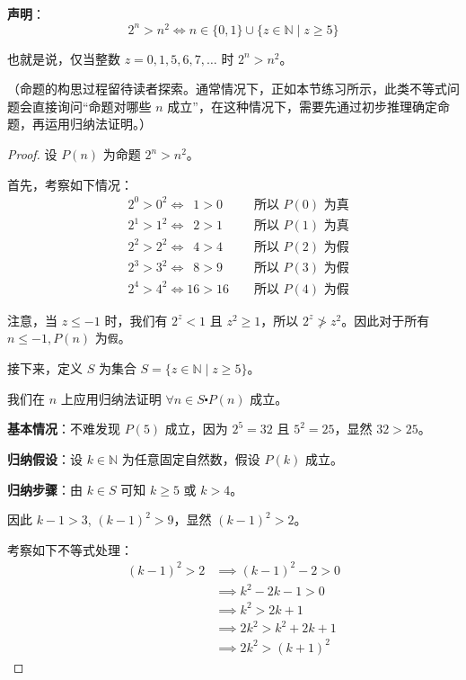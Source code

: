 \begin{example}[比较 $2^n$ 与 $n^2$ 的大小]

    \textbf{声明}：
    \[2^n > n^2 \iff n \in \{0,1\} \cup \{z \in \mathbb{N} \mid z \ge 5\}\]

    也就是说，仅当整数 $z=0,1,5,6,7,\dots$ 时 $2^n > n^2$。

    （命题的构思过程留待读者探索。通常情况下，正如本节练习所示，此类不等式问题会直接询问``命题对哪些 $n$ 成立''，在这种情况下，需要先通过初步推理确定命题，再运用归纳法证明。）

    \begin{proof}
        设 $P(n)$ 为命题 $2^n > n^2$。

        首先，考察如下情况：
        \begin{align*}
            & 2^0 > 0^2 \iff \enspace 1>0 \enspace \qquad \text{所以\ } P(0) \text{\ 为真}\\
            & 2^1 > 1^2 \iff \enspace 2>1 \enspace \qquad \text{所以\ } P(1) \text{\ 为真}\\
            & 2^2 > 2^2 \iff \enspace 4>4 \enspace \qquad \text{所以\ } P(2) \text{\ 为假}\\
            & 2^3 > 3^2 \iff \enspace 8>9 \enspace \qquad \text{所以\ } P(3) \text{\ 为假}\\
            & 2^4 > 4^2 \iff 16>16 \qquad \text{所以\ } P(4) \text{\ 为假}
        \end{align*}

        注意，当 $z \le -1$ 时，我们有 $2^z < 1$ 且 $z^2 \ge 1$，所以 $2^z \ngtr z^2$。因此对于所有 $n \le -1, P(n)$ 为\verb|假|。

        接下来，定义 $S$ 为集合 $S = \{z \in \mathbb{N} \mid z \ge 5\}$。

        我们在 $n$ 上应用归纳法证明 $\forall n \in S \centerdot P(n)$ 成立。

        \textbf{基本情况}：不难发现 $P(5)$ 成立，因为 $2^5=32$ 且 $5^2=25$，显然 $32 > 25$。

        \textbf{归纳假设}：设 $k \in \mathbb{N}$ 为任意固定自然数，假设 $P(k)$ 成立。

        \textbf{归纳步骤}：由 $k \in S$ 可知 $k \ge 5$ 或 $k > 4$。
        
        因此 $k-1>3$, $(k-1)^2>9$，显然 $(k-1)^2>2$。

        考察如下不等式处理：
        \begin{align*}
            (k-1)^2 > 2 &\implies (k-1)^2-2>0 \\
            &\implies k^2-2k-1>0 \\
            &\implies k^2>2k+1 \\
            &\implies 2k^2>k^2+2k+1 \\
            &\implies 2k^2>(k+1)^2 
        \end{align*}


\end{proof}
\end{example}

